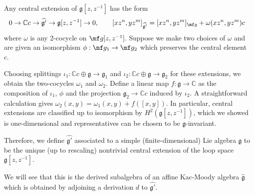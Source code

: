 \documentclass[12pt]{article}
\begin{document}
\begin{definition}
    Any central extension of $\mathfrak{g}[z,z^{-1}]$ has the form
    \[
        0 \to \mathbb{C}c \to \widehat{\mathfrak{g}'} \to \mathfrak{g}[z,z^{-1}] \to 0,
        \qquad
    [xz^n, yz^m]_{\widehat{\mathfrak{g}'}} = [xz^n,yz^m]_{\mf g} + \omega(xz^n,yz^m)c
    \]
    where $\omega$ is any 2-cocycle on $\mf g[z,z^{-1}]$. Suppose we make two choices of $\omega$ and are given an isomorphism $\phi:\mf g_1 \to \mf g_2$ which preserves the central element $c$.

    Choosing splittings $\iota_1: \mathbb{C}c \oplus \mathfrak{g} \to \mathfrak{g}_1$ and $\iota_2: \mathbb{C}c \oplus \mathfrak{g} \to \mathfrak{g}_2$ for these extensions, we obtain the two-cocycles $\omega_1$ and $\omega_2$. Define a linear map $f: \mathfrak{g} \to \mathbb{C}$ as the composition of $\iota_1$, $\phi$ and the projection $\mathfrak{g}_2 \to \mathbb{C}c$ induced by $\iota_2$. A straightforward calculation gives $\omega_2(x,y) = \omega_1(x,y) + f([x,y])$. In particular, central extensions are classified up to isomorphism by $H^2(\mathfrak{g}[z,z^{-1}])$, which we showed is one-dimensional and representatives can be chosen to be $\mathfrak{g}$-invariant.

    Therefore, we define $\widehat{\mathfrak{g}'}$ associated to a simple (finite-dimensional) Lie algebra $\mathfrak{g}$ to be the unique (up to rescaling) nontrivial central extension of the loop space $\mathfrak{g}[z,z^{-1}]$.
\end{definition}

We will see that this is the derived subalgebra of an affine Kac-Moody algebra $\widehat{\mathfrak{g}}$ which is obtained by adjoining a derivation $d$ to $\widehat{\mathfrak{g}'}$.
\end{document}
